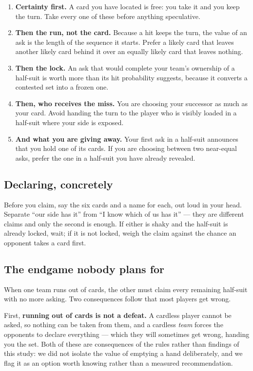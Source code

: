 \begin{enumerate}
  \item \textbf{Certainty first.} A card you have located is free: you take it and
        you keep the turn. Take every one of these before anything speculative.
  \item \textbf{Then the run, not the card.} Because a hit keeps the turn, the
        value of an ask is the length of the sequence it starts. Prefer a likely
        card that leaves another likely card behind it over an equally likely
        card that leaves nothing.
  \item \textbf{Then the lock.} An ask that would complete your team's ownership
        of a half-suit is worth more than its hit probability suggests, because
        it converts a contested set into a frozen one.
  \item \textbf{Then, who receives the miss.} You are choosing your successor as
        much as your card. Avoid handing the turn to the player who is visibly
        loaded in a half-suit where your side is exposed.
  \item \textbf{And what you are giving away.} Your first ask in a half-suit
        announces that you hold one of its cards. If you are choosing between two
        near-equal asks, prefer the one in a half-suit you have already revealed.
\end{enumerate}

\subsection{Declaring, concretely}

Before you claim, say the six cards and a name for each, out loud in your head.
Separate ``our side has it'' from ``I know which of us has it'' --- they are
different claims and only the second is enough. If either is shaky and the
half-suit is already locked, wait; if it is not locked, weigh the claim against
the chance an opponent takes a card first.

\subsection{The endgame nobody plans for}

When one team runs out of cards, the other must claim every remaining half-suit
with no more asking. Two consequences follow that most players get wrong.

First, \textbf{running out of cards is not a defeat.} A cardless player cannot be
asked, so nothing can be taken from them, and a cardless \emph{team} forces the
opponents to declare everything --- which they will sometimes get wrong, handing
you the set. Both of these are consequences of the rules rather than findings of
this study: we did not isolate the value of emptying a hand deliberately, and we
flag it as an option worth knowing rather than a measured recommendation.

